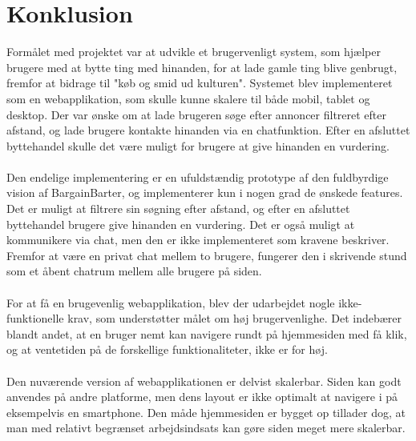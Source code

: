\chapter{Konklusion}
Formålet med projektet var at udvikle et brugervenligt system, som hjælper brugere med at bytte ting med hinanden, for at lade gamle ting blive genbrugt, fremfor at bidrage til "køb og smid ud kulturen". Systemet blev implementeret som en webapplikation, som skulle kunne skalere til både mobil, tablet og desktop. Der var ønske om at lade brugeren søge efter annoncer filtreret efter afstand, og lade brugere kontakte hinanden via en chatfunktion. Efter en afsluttet byttehandel skulle det være muligt for brugere at give hinanden en vurdering. \\ \\ \noindent
Den endelige implementering er en ufuldstændig prototype af den fuldbyrdige vision af BargainBarter, og implementerer kun i nogen grad de ønskede features. Det er muligt at filtrere sin søgning efter afstand, og efter en afsluttet byttehandel brugere give hinanden en vurdering. Det er også muligt at kommunikere via chat, men den er ikke implementeret som kravene beskriver. Fremfor at være en privat chat mellem to brugere, fungerer den i skrivende stund som et åbent chatrum mellem alle brugere på siden. 
\\ \\ \noindent
For at få en brugevenlig webapplikation, blev der udarbejdet nogle ikke-funktionelle krav, som understøtter målet om høj brugervenlighe. Det indebærer blandt andet, at en bruger nemt kan navigere rundt på hjemmesiden med få klik, og at ventetiden på de forskellige funktionaliteter, ikke er for høj. \\ \\ \noindent
Den nuværende version af webapplikationen er delvist skalerbar. Siden kan godt anvendes på andre platforme, men dens layout er ikke optimalt at navigere i på eksempelvis en smartphone. Den måde hjemmesiden er bygget op tillader dog, at man med relativt begrænset arbejdsindsats kan gøre siden meget mere skalerbar. 





